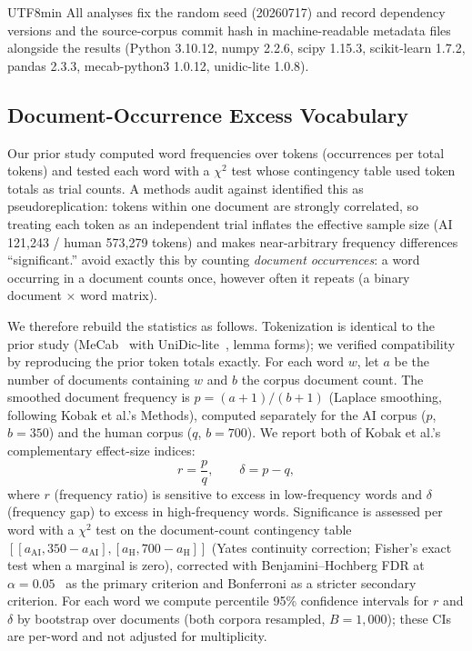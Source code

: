 \documentclass[11pt,a4paper]{article}
\begin{document}
\begin{CJK}{UTF8}{min}
All analyses fix the random seed (20260717) and record dependency versions and the source-corpus commit hash in machine-readable metadata files alongside the results (Python 3.10.12, numpy 2.2.6, scipy 1.15.3, scikit-learn 1.7.2, pandas 2.3.3, mecab-python3 1.0.12, unidic-lite 1.0.8).

\subsection{Document-Occurrence Excess Vocabulary}
\label{sec:lexmethod}

Our prior study computed word frequencies over tokens (occurrences per total tokens) and tested each word with a $\chi^2$ test whose contingency table used token totals as trial counts. A methods audit against \citet{kobak2025excess} identified this as pseudoreplication: tokens within one document are strongly correlated, so treating each token as an independent trial inflates the effective sample size (AI 121{,}243 / human 573{,}279 tokens) and makes near-arbitrary frequency differences ``significant.'' \citet{kobak2025excess} avoid exactly this by counting \emph{document occurrences}: a word occurring in a document counts once, however often it repeats (a binary document $\times$ word matrix).

We therefore rebuild the statistics as follows. Tokenization is identical to the prior study (MeCab~\citep{kudo2006mecab} with UniDic-lite~\citep{unidic2021}, lemma forms); we verified compatibility by reproducing the prior token totals exactly. For each word $w$, let $a$ be the number of documents containing $w$ and $b$ the corpus document count. The smoothed document frequency is $p = (a+1)/(b+1)$ (Laplace smoothing, following Kobak et al.'s Methods), computed separately for the AI corpus ($p$, $b=350$) and the human corpus ($q$, $b=700$). We report both of Kobak et al.'s complementary effect-size indices:
\begin{equation}
    r = \frac{p}{q}, \qquad \delta = p - q,
\end{equation}
where $r$ (frequency ratio) is sensitive to excess in low-frequency words and $\delta$ (frequency gap) to excess in high-frequency words. Significance is assessed per word with a $\chi^2$ test on the document-count contingency table $[[a_{\text{AI}}, 350-a_{\text{AI}}], [a_{\text{H}}, 700-a_{\text{H}}]]$ (Yates continuity correction; Fisher's exact test when a marginal is zero), corrected with Benjamini--Hochberg FDR at $\alpha=0.05$~\citep{benjamini1995fdr} as the primary criterion and Bonferroni as a stricter secondary criterion. For each word we compute percentile 95\% confidence intervals for $r$ and $\delta$ by bootstrap over documents (both corpora resampled, $B=1{,}000$); these CIs are per-word and not adjusted for multiplicity.


\end{CJK}
\end{document}

